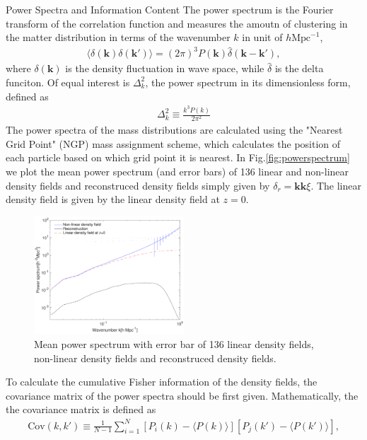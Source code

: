 \begin{section}{Power Spectra and Information Content}
  \label{sec:fisherinfo}
    The power spectrum is the Fourier transform of the correlation function and measures the amoutn of clustering in the matter distribution in terms of the wavenumber $k$ in unit of $h \mathrm{Mpc}^{-1}$,
\begin{align}
    \langle \delta \left( \bm{k} \right) \delta \left( \bm{k'}\right) \rangle =\left( 2\pi \right) ^3 P \left( \bm{k} \right) \hat{\delta} \left( \bm{k}-\bm{k'} \right),
\end{align}
where $\delta \left( \bm{k} \right)$ is the density fluctuation in wave space, while $\hat{\delta}$ is the delta funciton. Of equal interest is $\Delta ^2_k$, the power spectrum in its dimensionless form, defined as
\begin{align}
    \Delta ^2_k \equiv \frac{k^3 P \left( k \right)}{2\pi ^2}
\end{align}
    The power spectra of the mass distributions are calculated using the "Nearest Grid Point" (NGP) mass assignment scheme, which calculates the position of each particle based on which grid point it is nearest. In Fig.\ref{fig:powerspectrum} we plot the mean power spectrum (and error bars) of 136 linear and non-linear density fields and reconstruced density fields simply given by $\delta_r=\bm{k}\bm{k}\xi$. The linear density field is given by the linear density field at $z=0$.
\begin{figure}[t!]
\centering
\includegraphics[width=0.5\textwidth]{powerspectrum-crop.pdf}
\caption{Mean power spectrum with error bar of 136 linear density fields, non-linear density fields and reconstruced density fields.}
\end{figure}
    To calculate the cumulative Fisher information of the density fields, the covariance matrix of the power spectra should be first given. Mathematically, the the covariance matrix is defined as
\begin{align}
    \mathrm{Cov}\left(k,k'\right)\equiv \frac{1}{N-1}\sum_{i=1}^{N}\left[ P_i \left( k \right) - \langle P \left( k \right) \rangle \right]\left[ P_j \left( k' \right) - \langle P \left( k' \right)\rangle \right],

\end{align}
\end{section}
